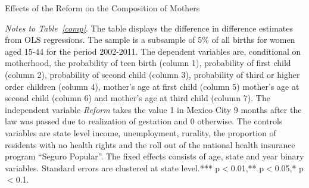 \documentclass[a4paper, 11pt]{article}
\begin{document}
\begin{spacing}{2}
\setcounter{table}{5}
\begin{table}\caption{Effects of the Reform on the Composition of Mothers}\label{comp}
  \centering
\begin{threeparttable}

\begin{tablenotes}
\footnotesize
\item \textit{Notes to Table~\ref{comp}}. The table displays the difference in difference estimates from OLS regressions. The sample is a subsample of 5\% of all births for women aged 15-44 for the period 2002-2011. The dependent variables are, conditional on motherhood, the probability of teen birth (column 1), probability of first child (column 2), probability of second child (column 3), probability of third or higher order children (column 4), mother's age at first child (column 5) mother's age at second child (column 6) and mother's age at third child (column 7). The independent variable \textit{Reform} takes the value 1 in Mexico City 9 months after the law was passed due to realization of gestation and 0 otherwise.  The controls variables are state level income, unemployment, rurality, the proportion of residents with no health rights and the roll out of the national health insurance program ``Seguro Popular''. The fixed effects consists of age, state and year binary variables. Standard errors are clustered at state level.*** p$<$0.01,** p$<$0.05,* p$<$0.1.
\end{tablenotes} 
\end{threeparttable}
 \end{table} 
 

\end{spacing}
\end{document}
